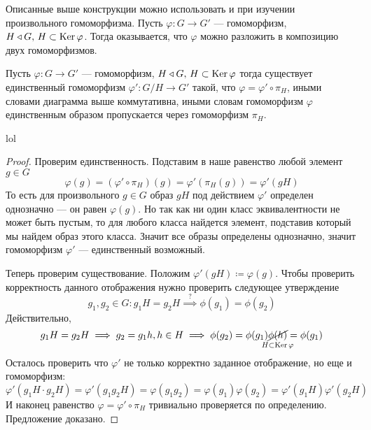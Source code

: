 \documentclass[../main.tex]{subfiles}
\begin{document}
  Описанные выше конструкции можно использовать и при изучении произвольного гомоморфизма. Пусть $\varphi\colon G \to G'$ --- гомоморфизм, $H \triangleleft G, \, H \subset \operatorname{Ker} \varphi$. Тогда оказывается, что $\varphi$ можно разложить в композицию двух гомоморфизмов.

\begin{figure}[ht]
    \centering
\end{figure}
\begin{theorem-non}
  \label{non:6.12}
  Пусть $\varphi\colon G \to G'$ --- гомоморфизм, $H \triangleleft G, \, H \subset \operatorname{Ker} \varphi$ тогда существует единственный гомоморфизм $\varphi'\colon G/H \to G'$ такой, что $\varphi = \varphi' \circ \pi_H$, иными словами диаграмма выше коммутативна, иными словам гомоморфизм $\varphi$ единственным образом пропускается через гомоморфизм $\pi_H$.
  \begin{editremark}
    lol
  \end{editremark}
\end{theorem-non}
\begin{proof}
  Проверим единственность. Подставим в наше равенство любой элемент $g \in G$
  \begin{equation*}
    \varphi(g) = (\varphi' \circ \pi_H)(g) = \varphi'(\pi_H(g)) = \varphi'(gH)
  \end{equation*}
  То есть для произвольного $g \in G$ образ $gH$ под действием $\varphi'$ определен однозначно --- он равен $\varphi(g)$. Но так как ни один класс эквивалентности не может быть пустым, то для любого класса найдется элемент, подставив который мы найдем образ этого класса. Значит все образы определены однозначно, значит гомоморфизм $\varphi'$ --- единственный возможный.

  Теперь проверим существование. Положим $\varphi'(gH) \coloneqq \varphi(g)$. Чтобы проверить корректность данного отображения нужно проверить следующее утверждение
  \begin{equation*}
    g_1, g_2 \in G \colon g_1H = g_2 H \overset{?}{\implies} \phi(g_1) = \phi(g_2)
  \end{equation*}
  Действительно,
  \begin{equation*}
    g_1H = g_2H \implies g_2 = g_1h, h \in H \implies \phi(g_2) = \phi(g_1)\underset{\mathclap{H \subset \Ker \varphi}}{\cancel{\phi(h)}} = \phi(g_1)
  \end{equation*}
  Осталось проверить что $\varphi'$ не только корректно заданное отображение, но еще и гомоморфизм:
  \begin{equation*}
    \varphi'(g_1H \cdot g_2H) = \varphi'(g_1g_2H) = \varphi(g_1g_2) = \varphi(g_1)\varphi(g_2) =
    \varphi'(g_1H)\varphi'(g_2H)
  \end{equation*}
  И наконец равенство $\varphi = \varphi' \circ \pi_H$ тривиально проверяется по определению. Предложение доказано.
\end{proof}
\end{document}
